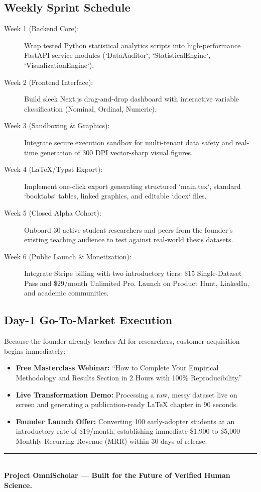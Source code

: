\documentclass[11pt,a4paper]{article}
\begin{document}
\subsection{Weekly Sprint Schedule}
\begin{description}
    \item[Week 1 (Backend Core):] Wrap tested Python statistical analytics scripts into high-performance FastAPI service modules (`DataAuditor`, `StatisticalEngine`, `VisualizationEngine`).
    \item[Week 2 (Frontend Interface):] Build sleek Next.js drag-and-drop dashboard with interactive variable classification (Nominal, Ordinal, Numeric).
    \item[Week 3 (Sandboxing \& Graphics):] Integrate secure execution sandbox for multi-tenant data safety and real-time generation of 300 DPI vector-sharp visual figures.
    \item[Week 4 (LaTeX/Typst Export):] Implement one-click export generating structured `main.tex`, standard `booktabs` tables, linked graphics, and editable `.docx` files.
    \item[Week 5 (Closed Alpha Cohort):] Onboard 30 active student researchers and peers from the founder's existing teaching audience to test against real-world thesis datasets.
    \item[Week 6 (Public Launch \& Monetization):] Integrate Stripe billing with two introductory tiers: \$15 Single-Dataset Pass and \$29/month Unlimited Pro. Launch on Product Hunt, LinkedIn, and academic communities.
\end{description}

\subsection{Day-1 Go-To-Market Execution}
Because the founder already teaches AI for researchers, customer acquisition begins immediately:
\begin{itemize}
    \item \textbf{Free Masterclass Webinar:} ``How to Complete Your Empirical Methodology and Results Section in 2 Hours with 100\% Reproducibility.''
    \item \textbf{Live Transformation Demo:} Processing a raw, messy dataset live on screen and generating a publication-ready LaTeX chapter in 90 seconds.
    \item \textbf{Founder Launch Offer:} Converting 100 early-adopter students at an introductory rate of \$19/month, establishing immediate \$1,900 to \$5,000 Monthly Recurring Revenue (MRR) within 30 days of release.
\end{itemize}

\vspace{2em}
\begin{center}
    \rule{0.6\linewidth}{0.8pt}\\[0.5em]
    \textbf{Project OmniScholar --- Built for the Future of Verified Human Science.}
\end{center}
\end{document}
